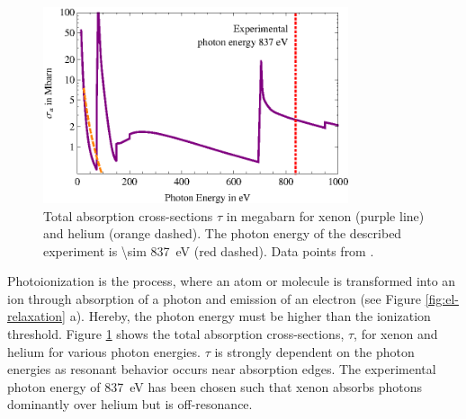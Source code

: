 \begin{figure}
	\centering
		\includegraphics[width=0.80\textwidth]{images/photoionization.eps}
	\caption[Total absorption cross-sections for helium and xenon.]{Total absorption cross-sections $\tau$ in megabarn for xenon (purple line) and helium (orange dashed). The photon energy of the described experiment is \SI{\sim 837}{\electronvolt} (red dashed). Data points from \citep{Elettra-2016-Website,Yeh-1985-AtmDat,Yeh-1993-GBSP}.}
	\label{fig:photoionization}
\end{figure}
%
Photoionization is the process, where an atom or molecule is transformed into an ion through absorption of a photon and emission of an electron (see Figure \ref{fig:el-relaxation} a). Hereby, the photon energy must be higher than the ionization threshold. Figure \ref{fig:photoionization} shows the total absorption cross-sections, $\tau$, for xenon and helium for various photon energies. $\tau$ is strongly dependent on the photon energies as resonant behavior occurs near absorption edges. The experimental photon energy of \SI{837}{\electronvolt} has been chosen such that xenon absorbs photons dominantly over helium but is off-resonance.
